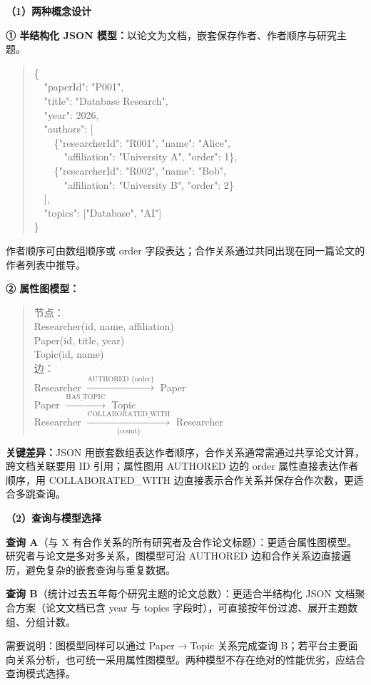 \documentclass[UTF8,a4paper,11pt]{ctexart}
\newenvironment{answer}%
  {\begin{ans}\noindent{\bfseries\color{ansframe}【答案】}\hspace{0.4em}}%
  {\end{ans}}
\begin{document}
\begin{enumerate}
\begin{answer}
\textbf{（1）两种概念设计}\par
\textbf{① 半结构化 JSON 模型：}以论文为文档，嵌套保存作者、作者顺序与研究主题。
\begin{quote}\ttfamily\small
\{\\
\ \ "paperId": "P001",\\
\ \ "title": "Database Research",\\
\ \ "year": 2026,\\
\ \ "authors": [\\
\ \ \ \ \{"researcherId": "R001", "name": "Alice",\\
\ \ \ \ \ \ "affiliation": "University A", "order": 1\},\\
\ \ \ \ \{"researcherId": "R002", "name": "Bob",\\
\ \ \ \ \ \ "affiliation": "University B", "order": 2\}\\
\ \ ],\\
\ \ "topics": ["Database", "AI"]\\
\}
\end{quote}
作者顺序可由数组顺序或 order 字段表达；合作关系通过共同出现在同一篇论文的作者列表中推导。\par
\textbf{② 属性图模型：}
\begin{quote}\small
节点：\\
\quad Researcher(id, name, affiliation)\\
\quad Paper(id, title, year)\\
\quad Topic(id, name)\\[4pt]
边：\\
\quad Researcher $\xrightarrow{\text{AUTHORED }\{\text{order}\}}$ Paper\\
\quad Paper $\xrightarrow{\text{HAS\_TOPIC}}$ Topic\\
\quad Researcher $\xrightarrow[\text{\{count\}}]{\text{COLLABORATED\_WITH}}$ Researcher
\end{quote}
\textbf{关键差异：}JSON 用嵌套数组表达作者顺序，合作关系通常需通过共享论文计算，跨文档关联要用 ID 引用；属性图用 AUTHORED 边的 order 属性直接表达作者顺序，用 COLLABORATED\_WITH 边直接表示合作关系并保存合作次数，更适合多跳查询。\par
\textbf{（2）查询与模型选择}\par
\textbf{查询 A}（与 X 有合作关系的所有研究者及合作论文标题）：更适合属性图模型。研究者与论文是多对多关系，图模型可沿 AUTHORED 边和合作关系边直接遍历，避免复杂的嵌套查询与重复数据。\par
\textbf{查询 B}（统计过去五年每个研究主题的论文总数）：更适合半结构化 JSON 文档聚合方案（论文文档已含 year 与 topics 字段时），可直接按年份过滤、展开主题数组、分组计数。\par
需要说明：图模型同样可以通过 Paper$\rightarrow$Topic 关系完成查询 B；若平台主要面向关系分析，也可统一采用属性图模型。两种模型不存在绝对的性能优劣，应结合查询模式选择。
\end{answer}


\end{enumerate}
\end{document}
